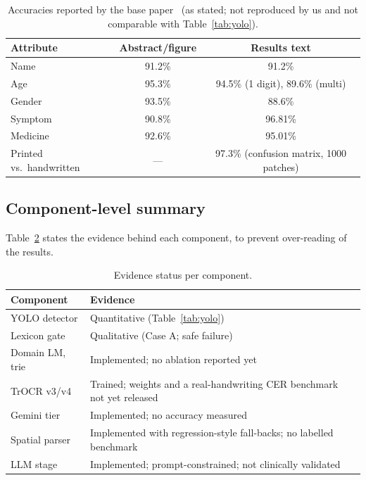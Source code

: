\documentclass[journal]{IEEEtran}
\begin{document}
\begin{table}[t]
\centering
\caption{Accuracies reported by the base paper~\cite{biswas2026novel} (as stated; not reproduced by us and not comparable with Table~\ref{tab:yolo}).}
\label{tab:baseacc}
\small
\begin{tabular}{lcc}
\toprule
\textbf{Attribute} & \textbf{Abstract/figure} & \textbf{Results text} \\
\midrule
Name & 91.2\% & 91.2\% \\
Age & 95.3\% & 94.5\% (1 digit), 89.6\% (multi) \\
Gender & 93.5\% & 88.6\% \\
Symptom & 90.8\% & 96.81\% \\
Medicine & 92.6\% & 95.01\% \\
Printed vs.\ handwritten & --- & 97.3\% (confusion matrix, 1000 patches) \\
\bottomrule
\end{tabular}
\end{table}

\subsection{Component-level summary}
Table~\ref{tab:status} states the evidence behind each component, to prevent over-reading of the results.

\begin{table}[t]
\centering
\caption{Evidence status per component.}
\label{tab:status}
\small
\begin{tabular}{p{2.5cm}p{5.4cm}}
\toprule
\textbf{Component} & \textbf{Evidence} \\
\midrule
YOLO detector & Quantitative (Table~\ref{tab:yolo}) \\
Lexicon gate & Qualitative (Case A; safe failure) \\
Domain LM, trie & Implemented; no ablation reported yet \\
TrOCR v3/v4 & Trained; weights and a real-handwriting CER benchmark not yet released \\
Gemini tier & Implemented; no accuracy measured \\
Spatial parser & Implemented with regression-style fall-backs; no labelled benchmark \\
LLM stage & Implemented; prompt-constrained; not clinically validated \\
\bottomrule
\end{tabular}
\end{table}
\end{document}
